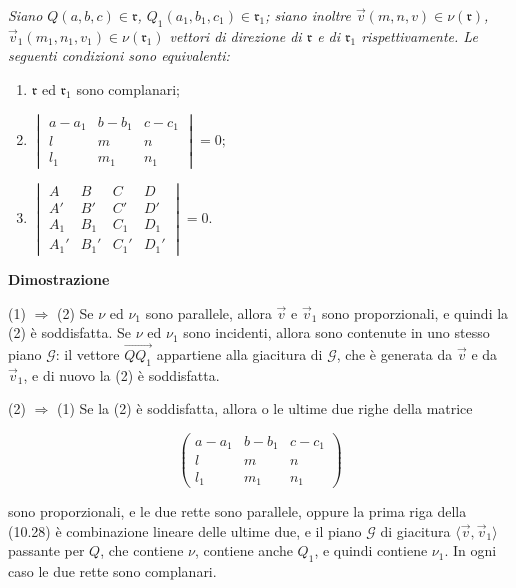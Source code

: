 \documentclass{article}
\theoremstyle{plain}
\theoremstyle{definition}
\theoremstyle{remark}
\begin{document}
\textit{Siano $Q(a, b, c) \in \mathfrak{r}$, $Q_1(a_1, b_1, c_1) \in \mathfrak{r}_1$; siano inoltre $\vec{v}(m, n, v) \in \nu(\mathfrak{r})$, $\vec{v}_1(m_1, n_1, v_1) \in \nu(\mathfrak{r}_1)$ vettori di direzione di $\mathfrak{r}$ e di $\mathfrak{r}_1$ rispettivamente. Le seguenti condizioni sono equivalenti:}
\begin{enumerate}
    \item $\mathfrak{r}$ ed $\mathfrak{r}_1$ sono complanari;
\end{enumerate}


\begin{enumerate}
    \setcounter{enumi}{1}
    \item $\begin{vmatrix}
        a - a_1 & b - b_1 & c - c_1 \\
        l & m & n \\
        l_1 & m_1 & n_1
    \end{vmatrix} = 0;$

    \item $\begin{vmatrix}
        A & B & C & D \\
        A' & B' & C' & D' \\
        A_1 & B_1 & C_1 & D_1 \\
        A_1' & B_1' & C_1' & D_1'
    \end{vmatrix} = 0.$
\end{enumerate}

\textbf{Dimostrazione}

(1) $\Rightarrow$ (2) \quad Se $\nu$ ed $\nu_1$ sono parallele, allora $\vec{v}$ e $\vec{v}_1$ sono proporzionali, e quindi la (2) è soddisfatta. Se $\nu$ ed $\nu_1$ sono incidenti, allora sono contenute in uno stesso piano $\mathscr{G}$: il vettore $\overrightarrow{QQ_1}$ appartiene alla giacitura di $\mathscr{G}$, che è generata da $\vec{v}$ e da $\vec{v}_1$, e di nuovo la (2) è soddisfatta.

(2) $\Rightarrow$ (1) \quad Se la (2) è soddisfatta, allora o le ultime due righe della matrice

\begin{equation}
\begin{pmatrix}
a - a_1 & b - b_1 & c - c_1 \\
l & m & n \\
l_1 & m_1 & n_1
\end{pmatrix}
\tag{10.28}
\end{equation}

sono proporzionali, e le due rette sono parallele, oppure la prima riga della (10.28) è combinazione lineare delle ultime due, e il piano $\mathscr{G}$ di giacitura $\langle \vec{v}, \vec{v}_1 \rangle$ passante per $Q$, che contiene $\nu$, contiene anche $Q_1$, e quindi contiene $\nu_1$. In ogni caso le due rette sono complanari.
\end{document}
